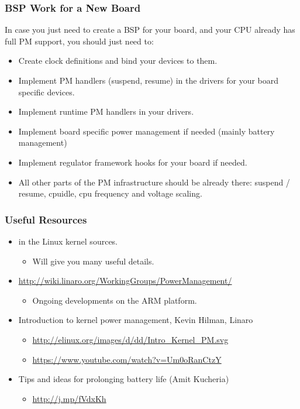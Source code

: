 \begin{frame}
  \frametitle{BSP Work for a New Board}
  In case you just need to create a BSP for your board, and your
  CPU already has full PM support, you should just need to:
  \begin{itemize}
  \item Create clock definitions and bind your devices to them.
  \item Implement PM handlers (suspend, resume) in the drivers for
    your board specific devices.
  \item Implement runtime PM handlers in your drivers.
  \item Implement board specific power management if needed (mainly
    battery management)
  \item Implement regulator framework hooks for your board if
    needed.
  \item All other parts of the PM infrastructure should be already
    there: suspend / resume, cpuidle, cpu frequency and voltage
    scaling.
  \end{itemize}
\end{frame}

\begin{frame}
  \frametitle{Useful Resources}
  \begin{itemize}
  \item {} in the Linux kernel sources.
    \begin{itemize}
    \item Will give you many useful details.
    \end{itemize}
  \item {\small \url{http://wiki.linaro.org/WorkingGroups/PowerManagement/}}
    \begin{itemize}
    \item Ongoing developments on the ARM platform.
    \end{itemize}
  \item Introduction to kernel power management, Kevin Hilman, Linaro
    \begin{itemize}
      \item \url{http://elinux.org/images/d/dd/Intro_Kernel_PM.svg}
      \item \url{https://www.youtube.com/watch?v=Um0oRanCtzY}
    \end{itemize}
  \item Tips and ideas for prolonging battery life (Amit Kucheria)
    \begin{itemize}
    \item \url{http://j.mp/fVdxKh}
    \end{itemize}
  \end{itemize}
\end{frame}

